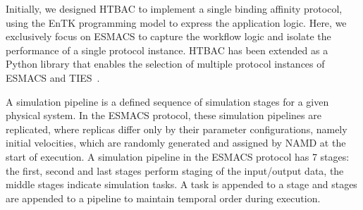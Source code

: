 Initially, we designed HTBAC to implement a single binding affinity protocol,
using the EnTK programming model to express the application logic. Here, we
exclusively focus on ESMACS to capture the workflow logic and isolate the
performance of a single protocol instance. HTBAC has been extended as a
Python library that enables the selection of multiple protocol instances of
ESMACS and TIES~\cite{dakka}.

A simulation pipeline is a defined sequence of simulation stages for a given
physical system. In the ESMACS protocol, these simulation pipelines are
replicated, where replicas differ only by their parameter configurations,
namely initial velocities, which are randomly generated and assigned by NAMD
at the start of execution. A simulation pipeline in the ESMACS protocol has 7
stages: the first, second and last stages perform staging of the input/output
data, the middle stages indicate simulation tasks. A task is appended to a
stage and stages are appended to a pipeline to maintain temporal order during
execution.



